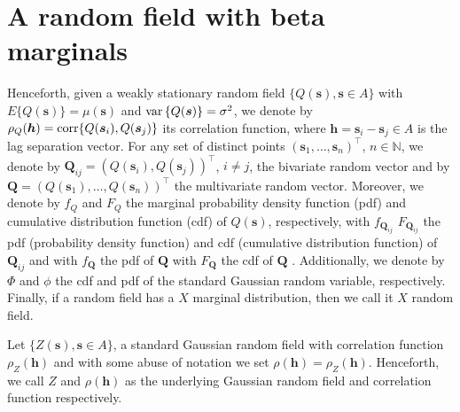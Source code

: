 \documentclass[times,sort&compress,3p]{elsarticle}
\theoremstyle{plain}%
\theoremstyle{definition}
\def\QQ{\bm{Q}}
\def\ss{\bm{s}}
\def\VV{{\rm var}}
\def\hh{\bm{h}}
\def\cor{{\rm corr}}
\begin{document}
\section{A random field with beta marginals}\label{sec:2}

Henceforth, given a weakly stationary random field  $\{Q(\ss), \ss \in A \}$ with  $E\{Q(\ss)\}=\mu(\ss)$ and $\VV\left\{Q(\ss)\right\}=\sigma^2$, we denote by $\rho_Q(\hh)=\cor\{Q(\ss_i),Q(\ss_j)\}$ its correlation function, where $\hh=\ss_i-\ss_j \in A$ is the lag separation vector. For any set of  distinct points $(\ss_1,\ldots,\ss_n)^\top$, $n\in \mathbb{N}$, we denote by $\QQ_{ij}=(Q(\ss_i),Q(\ss_j))^\top$, $i \neq j$, the bivariate random vector and by $\QQ=(Q(\ss_1),\ldots, Q(\ss_n))^\top$ the multivariate random vector. Moreover, we denote by $f_{Q}$ and  $F_{Q}$ the marginal probability density function (pdf) and cumulative distribution function (cdf) of  $Q(\ss)$, respectively, with  $f_{\QQ_{ij}}$  $F_{\QQ_{ij}}$ the pdf (probability density function) and cdf (cumulative distribution function)  of $\QQ_{ij}$ and with $f_{\QQ}$ the pdf of $\QQ$
with $F_{\QQ}$ the cdf of $\QQ$
. Additionally, we denote by $\Phi$ and $\phi$ the cdf and pdf of the standard Gaussian random variable, respectively. Finally, if a random field has a $X$ marginal distribution, then we call it $X$ random field.

Let $\{Z(\ss), \ss \in A\}$, a standard Gaussian random field  with correlation function  $\rho_Z(\hh)$ and with some abuse of notation we set $\rho(\hh)=\rho_Z(\hh)$. Henceforth, we call  $Z$ and $\rho(\hh)$ as  the underlying Gaussian random field and correlation function respectively.
\end{document}

